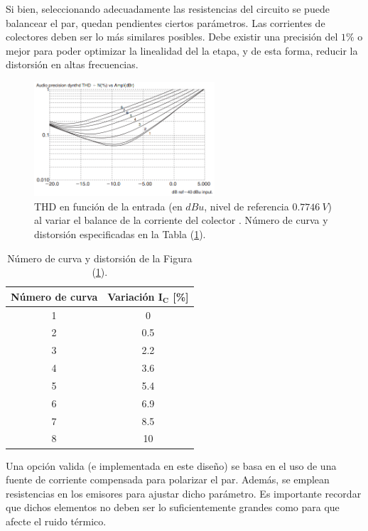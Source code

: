 Si bien, seleccionando adecuadamente las resistencias del circuito se puede balancear el par, quedan pendientes ciertos parámetros. Las corrientes de colectores deben ser lo más similares posibles. Debe existir una precisión del $1\%$ o mejor para poder optimizar la linealidad del la etapa, y de esta forma, reducir la distorsión en altas frecuencias.
\begin{figure}[H]
\centering
	\includegraphics[width=0.6\textwidth]{ImagenesInput-Stage/thd2.PNG}
	\caption{THD en función de la entrada (en $dBu$, nivel de referencia $0.7746 \ V$) al variar el balance de la corriente del colector . Número de curva y distorsión especificadas en la Tabla (\ref{tab:thd2}).}
	\label{fig:thd2}
\end{figure}

\begin{table}[H]
\centering
\begin{tabular}{cc}
\hline
\textbf{Número de curva} & \textbf{Variación $\mathbf{I_C}$ [\%]} \\ \hline
1                        & 0                    \\
2                        & 0.5                  \\
3                        & 2.2                  \\
4                        & 3.6                  \\
5                        & 5.4                  \\
6                        & 6.9                  \\
7                        & 8.5                  \\
8                        & 10             		\\
\hline
\end{tabular}
\caption{Número de curva y distorsión de la Figura (\ref{fig:thd2}).}
\label{tab:thd2}
\end{table}

Una opción valida (e implementada en este diseño) se basa en el uso de una fuente de corriente compensada para polarizar el par. Además, se emplean resistencias en los emisores para ajustar dicho parámetro. Es importante recordar que dichos elementos no deben ser lo suficientemente grandes como para que afecte el ruido térmico.  

